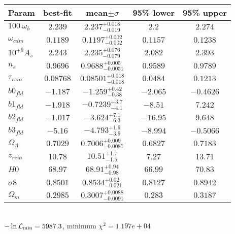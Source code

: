 \begin{tabular}{|l|c|c|c|c|} 
 \hline 
Param & best-fit & mean$\pm\sigma$ & 95\% lower & 95\% upper \\ \hline 
$100~\omega_{b }$ &$2.239$ & $2.237_{-0.019}^{+0.018}$ & $2.2$ & $2.274$ \\ 
$\omega_{cdm }$ &$0.1189$ & $0.1197_{-0.002}^{+0.002}$ & $0.1157$ & $0.1238$ \\ 
$10^{+9}A_{s }$ &$2.243$ & $2.235_{-0.079}^{+0.076}$ & $2.082$ & $2.393$ \\ 
$n_{s }$ &$0.9696$ & $0.9688_{-0.0051}^{+0.005}$ & $0.9589$ & $0.9789$ \\ 
$\tau_{reio }$ &$0.08768$ & $0.08501_{-0.018}^{+0.018}$ & $0.0484$ & $0.1213$ \\ 
$b0_{fld }$ &$-1.187$ & $-1.259_{-0.38}^{+0.42}$ & $-2.065$ & $-0.4626$ \\ 
$b1_{fld }$ &$-1.918$ & $-0.7239_{-4.1}^{+3.7}$ & $-8.51$ & $7.242$ \\ 
$b2_{fld }$ &$-1.017$ & $-3.624_{-6.3}^{+7.1}$ & $-16.95$ & $9.648$ \\ 
$b3_{fld }$ &$-5.16$ & $-4.793_{-3.9}^{+1.9}$ & $-8.994$ & $-0.5066$ \\ 
$\Omega_{\Lambda }$ &$0.7029$ & $0.7006_{-0.0087}^{+0.009}$ & $0.6827$ & $0.7183$ \\ 
$z_{reio }$ &$10.78$ & $10.51_{-1.5}^{+1.7}$ & $7.27$ & $13.71$ \\ 
$H0$ &$68.97$ & $68.91_{-0.98}^{+0.94}$ & $66.99$ & $70.83$ \\ 
$\sigma8$ &$0.8501$ & $0.8534_{-0.021}^{+0.02}$ & $0.8127$ & $0.8942$ \\ 
$\Omega_{m }$ &$0.2985$ & $0.3007_{-0.0091}^{+0.0088}$ & $0.283$ & $0.3187$ \\ 
\hline 
 \end{tabular} \\ 
$-\ln{\cal L}_\mathrm{min} =5987.3$, minimum $\chi^2=1.197e+04$ \\ 
